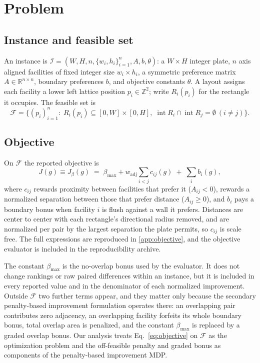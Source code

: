 \documentclass[preprint,12pt,authoryear,nonatbib]{elsarticle}
\newcommand{\R}{\mathbb{R}}
\newcommand{\Z}{\mathbb{Z}}
\newcommand{\cF}{\mathcal{F}}
\begin{document}
\section{Problem}
\label{sec:problem}

\subsection{Instance and feasible set}
An instance is
$\mathcal{I}=(W,H,n,\{w_i,h_i\}_{i=1}^n,A,b,\theta)$: a $W\times H$ integer
plate, $n$ axis aligned facilities of fixed integer size $w_i\times h_i$, a
symmetric preference matrix $A\in\R^{n\times n}$, boundary preferences $b$, and
objective constants $\theta$. A layout assigns each facility a lower left lattice
position $p_i\in\Z^2$; write $R_i(p_i)$ for the rectangle it occupies. The
feasible set is
\begin{equation}
\cF=\Big\{(p_i)_{i=1}^n:\;R_i(p_i)\subseteq[0,W]\times[0,H],\;
\operatorname{int}R_i\cap\operatorname{int}R_j=\emptyset\ (i\neq j)\Big\}.
\label{eq:feasible}
\end{equation}

\subsection{Objective}
On $\cF$ the reported objective is
\begin{equation}
J(g)\equiv J_{\beta}(g)\;=\;\beta_{\max}
 +w_{\mathrm{adj}}\sum_{i<j} c_{ij}(g)\;+\;\sum_i b_i(g),
\label{eq:objective}
\end{equation}
where $c_{ij}$ rewards proximity between facilities that prefer it
($A_{ij}<0$), rewards a normalized separation between those that prefer distance
($A_{ij}\ge 0$), and $b_i$ pays a
boundary bonus when facility $i$ is flush against a wall it prefers. Distances
are center to center with each rectangle's directional radius removed, and are
normalized per pair by the largest separation the plate permits, so $c_{ij}$ is
scale free. The full expressions are reproduced in \ref{app:objective}, and the
objective evaluator is included in the reproducibility archive.

The constant $\beta_{\max}$ is the no-overlap bonus used by the evaluator. It
does not change rankings or raw paired differences within an instance, but it
is included in every reported value and in the denominator of each normalized
improvement. Outside $\cF$ two further terms appear, and they matter only because the
secondary penalty-based improvement formulation operates there: an
overlapping pair contributes zero adjacency, an overlapping facility forfeits its
whole boundary bonus, total overlap area is penalized, and the constant
$\beta_{\max}$ is replaced by a graded overlap bonus. Our analysis treats
Eq.~\eqref{eq:objective} on $\cF$ as the optimization problem and the off-feasible
penalty and graded bonus as components of the penalty-based improvement MDP.
\end{document}
